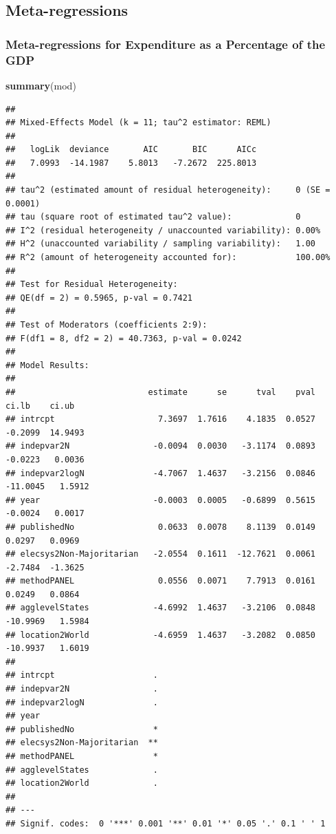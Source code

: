 \documentclass[
]{article}
\newenvironment{Shaded}{\begin{snugshade}}{\end{snugshade}}
\newcommand{\KeywordTok}[1]{\textcolor[rgb]{0.13,0.29,0.53}{\textbf{#1}}}
\newcommand{\NormalTok}[1]{#1}
\begin{document}
\newpage

\hypertarget{meta-regressions}{%
\subsection{Meta-regressions}\label{meta-regressions}}

\hypertarget{meta-regressions-for-expenditure-as-a-percentage-of-the-gdp}{%
\subsubsection{Meta-regressions for Expenditure as a Percentage of the
GDP}\label{meta-regressions-for-expenditure-as-a-percentage-of-the-gdp}}

\begin{Shaded}
\begin{Highlighting}[]
\KeywordTok{summary}\NormalTok{(mod)}
\end{Highlighting}
\end{Shaded}

\begin{verbatim}
## 
## Mixed-Effects Model (k = 11; tau^2 estimator: REML)
## 
##   logLik  deviance       AIC       BIC      AICc 
##   7.0993  -14.1987    5.8013   -7.2672  225.8013   
## 
## tau^2 (estimated amount of residual heterogeneity):     0 (SE = 0.0001)
## tau (square root of estimated tau^2 value):             0
## I^2 (residual heterogeneity / unaccounted variability): 0.00%
## H^2 (unaccounted variability / sampling variability):   1.00
## R^2 (amount of heterogeneity accounted for):            100.00%
## 
## Test for Residual Heterogeneity:
## QE(df = 2) = 0.5965, p-val = 0.7421
## 
## Test of Moderators (coefficients 2:9):
## F(df1 = 8, df2 = 2) = 40.7363, p-val = 0.0242
## 
## Model Results:
## 
##                           estimate      se      tval    pval     ci.lb    ci.ub 
## intrcpt                     7.3697  1.7616    4.1835  0.0527   -0.2099  14.9493 
## indepvar2N                 -0.0094  0.0030   -3.1174  0.0893   -0.0223   0.0036 
## indepvar2logN              -4.7067  1.4637   -3.2156  0.0846  -11.0045   1.5912 
## year                       -0.0003  0.0005   -0.6899  0.5615   -0.0024   0.0017 
## publishedNo                 0.0633  0.0078    8.1139  0.0149    0.0297   0.0969 
## elecsys2Non-Majoritarian   -2.0554  0.1611  -12.7621  0.0061   -2.7484  -1.3625 
## methodPANEL                 0.0556  0.0071    7.7913  0.0161    0.0249   0.0864 
## agglevelStates             -4.6992  1.4637   -3.2106  0.0848  -10.9969   1.5984 
## location2World             -4.6959  1.4637   -3.2082  0.0850  -10.9937   1.6019 
##  
## intrcpt                    . 
## indepvar2N                 . 
## indepvar2logN              . 
## year 
## publishedNo                * 
## elecsys2Non-Majoritarian  ** 
## methodPANEL                * 
## agglevelStates             . 
## location2World             . 
## 
## ---
## Signif. codes:  0 '***' 0.001 '**' 0.01 '*' 0.05 '.' 0.1 ' ' 1
\end{verbatim}
\end{document}
